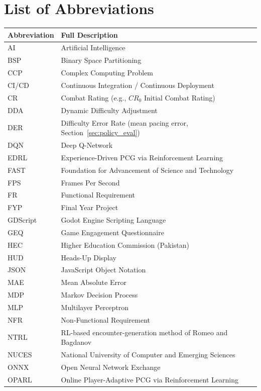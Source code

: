 \chapter*{List of Abbreviations}

\begin{longtable}{ll}
\toprule
\textbf{Abbreviation} & \textbf{Full Description} \\
\midrule
AI & Artificial Intelligence \\
BSP & Binary Space Partitioning \\
CCP & Complex Computing Problem \\
CI/CD & Continuous Integration / Continuous Deployment \\
CR & Combat Rating (e.g., $CR_0$ Initial Combat Rating) \\
DDA & Dynamic Difficulty Adjustment \\
DER & Difficulty Error Rate (mean pacing error, Section~\ref{sec:policy_eval}) \\
DQN & Deep Q-Network \\
EDRL & Experience-Driven PCG via Reinforcement Learning \\
FAST & Foundation for Advancement of Science and Technology \\
FPS & Frames Per Second \\
FR & Functional Requirement \\
FYP & Final Year Project \\
GDScript & Godot Engine Scripting Language \\
GEQ & Game Engagement Questionnaire \\
HEC & Higher Education Commission (Pakistan) \\
HUD & Heads-Up Display \\
JSON & JavaScript Object Notation \\
MAE & Mean Absolute Error \\
MDP & Markov Decision Process \\
MLP & Multilayer Perceptron \\
NFR & Non-Functional Requirement \\
NTRL & RL-based encounter-generation method of Romeo and Bagdanov \\
NUCES & National University of Computer and Emerging Sciences \\
ONNX & Open Neural Network Exchange \\
OPARL & Online Player-Adaptive PCG via Reinforcement Learning \\

\end{longtable}

